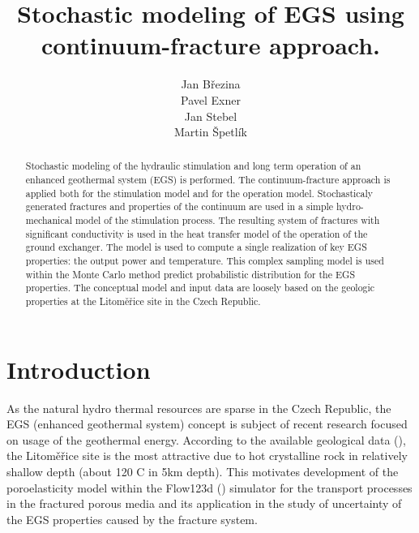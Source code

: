 \documentclass{article}
\title{Stochastic modeling of EGS using continuum-fracture approach.}
\author{
  Jan Březina \\
  \And
  Pavel Exner \\
  \And
  Jan Stebel \\
  \And
  Martin Špetlík \\
}
\begin{document}
\maketitle

\begin{abstract}
Stochastic modeling of the hydraulic stimulation and long term operation of an enhanced geothermal system (EGS) is performed. The continuum-fracture approach is applied both for the stimulation model and for the operation model. Stochasticaly generated fractures and properties of the continuum are used in a simple hydro-mechanical model of the stimulation process. The resulting system of fractures with significant conductivity is used in the heat transfer model of the operation of the ground exchanger. The model is used to compute a single realization of key EGS properties: the output power and temperature. This complex sampling model is used within the Monte Carlo method predict probabilistic distribution for the EGS properties. The conceptual model and input data are loosely based on the geologic properties at the Litoměřice site in the Czech Republic.
\end{abstract}




\section{Introduction}
As the natural hydro thermal resources are sparse in the Czech Republic, the EGS (enhanced geothermal system) concept is subject of recent research focused on usage of the geothermal energy. According to the available geological data (\cite{Capova2013}), the Litoměřice site is the most attractive due to hot crystalline rock in relatively shallow depth (about 120 \textdegree C in 5km depth). This motivates development of the poroelasticity model within the Flow123d (\cite{flow123d}) simulator for the transport processes in the fractured porous media and its application in the study of uncertainty of the EGS properties caused by the fracture system.
\end{document}
